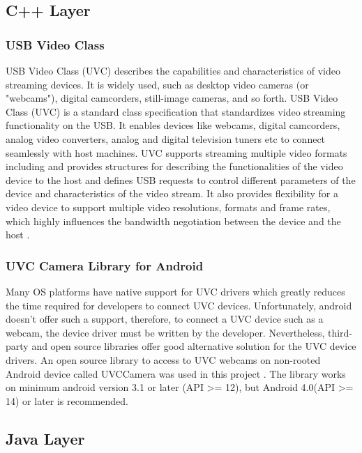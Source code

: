 \subsection{C++ Layer}
\subsubsection{USB Video Class}

USB Video Class (UVC) describes the capabilities and characteristics of video streaming devices. It is widely used, such as desktop video cameras (or "webcams"), digital camcorders, still-image cameras, and so forth. USB Video Class (UVC) is a standard class specification that standardizes video streaming functionality on the USB. It enables devices like webcams, digital camcorders, analog video converters, analog and digital television tuners etc to connect seamlessly with host machines. UVC supports streaming multiple video formats including and provides structures for describing the functionalities of the video device to the host and defines USB requests to control different parameters of the device and characteristics of the video stream. It also provides flexibility for a video device to support multiple video resolutions, formats and frame rates, which highly influences the bandwidth negotiation between the device and the host \parencite{uvc}.

\subsubsection{UVC Camera Library for Android}
Many OS platforms have native support for UVC drivers which greatly reduces the time required for developers to connect UVC devices. Unfortunately, android doesn’t offer such a support, therefore, to connect a UVC device such as a webcam, the device driver must be written by the developer. 
Nevertheless, third-party and open source libraries offer good alternative solution for the UVC device drivers. An open source library to access to UVC webcams on non-rooted Android device called UVCCamera was used in this project \parencite{uvcCamera}. The library works on minimum android version 3.1 or later (API >= 12), but Android 4.0(API >= 14) or later is recommended.



\subsection{Java Layer}


